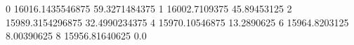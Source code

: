 0 16016.1435546875 59.3271484375
1 16002.7109375 45.89453125
2 15989.3154296875 32.4990234375
4 15970.10546875 13.2890625
6 15964.8203125 8.00390625
8 15956.81640625 0.0

